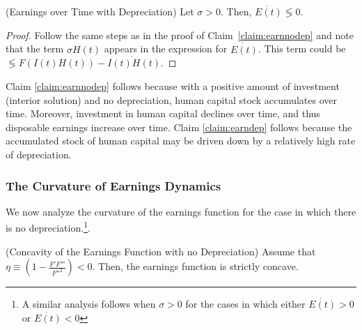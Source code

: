 \begin{claim} (Earnings over Time with Depreciation) \label{claim:earndep}
Let $\sigma > 0$. Then, $\dot{E(t)} \lessgtr 0$. 
\end{claim}

\begin{proof}
Follow the same steps as in the proof of Claim~\ref{claim:earnnodep} and note that the term $\sigma H(t)$ appears in the expression for $\dot{E(t)}$. This term could be $\lessgtr F \left( I(t) H(t) \right) - \dot{I(t)H(t)} $.
\end{proof}

\indent Claim \ref{claim:earnnodep} follows because with a positive amount of investment (interior solution) and no depreciation, human capital stock accumulates over time. Moreover, investment in human capital declines over time, and thus disposable earnings increase over time. Claim \ref{claim:earndep} follows because the accumulated stock of human capital may be driven down by a relatively high rate of depreciation.

\subsubsection{The Curvature of Earnings Dynamics} \label{section:egdyn}
\indent We now analyze the curvature of the earnings function for the case in which there is no depreciation.\footnote{A similar analysis follows when $\sigma>0$ for the cases in which either $\dot{E(t)}> 0$ or $\dot{E(t)}< 0$}. 

\begin{claim} (Concavity of the Earnings Function with no Depreciation)
\label{claim:concearnnodep}
Assume that $\eta \equiv \left( 1 - \frac{F'F'''}{{F''}^2} \right) < 0$. Then, the earnings function is strictly concave. 
\end{claim}

